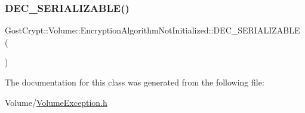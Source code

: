 \subsubsection{\texorpdfstring{D\+E\+C\+\_\+\+S\+E\+R\+I\+A\+L\+I\+Z\+A\+B\+L\+E()}{DEC\_SERIALIZABLE()}}
{\footnotesize\ttfamily Gost\+Crypt\+::\+Volume\+::\+Encryption\+Algorithm\+Not\+Initialized\+::\+D\+E\+C\+\_\+\+S\+E\+R\+I\+A\+L\+I\+Z\+A\+B\+LE (\begin{DoxyParamCaption}\item[{\hyperlink{class_gost_crypt_1_1_volume_1_1_encryption_algorithm_not_initialized}{Encryption\+Algorithm\+Not\+Initialized}}]{ }\end{DoxyParamCaption})}



The documentation for this class was generated from the following file\+:\begin{DoxyCompactItemize}
\item 
Volume/\hyperlink{_volume_exception_8h}{Volume\+Exception.\+h}\end{DoxyCompactItemize}
